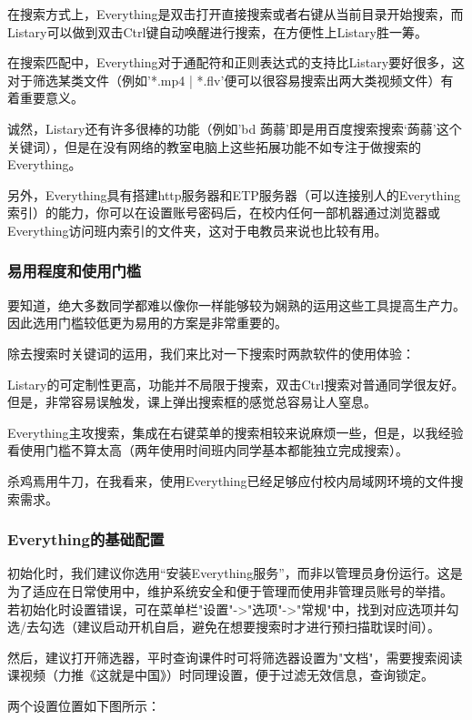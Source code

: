 \documentclass[a5paper]{article}
\begin{document}
            在搜索方式上，Everything是双击打开直接搜索或者右键从当前目录开始搜索，而Listary可以做到双击Ctrl键自动唤醒进行搜索，在方便性上Listary胜一筹。

            在搜索匹配中，Everything对于通配符和正则表达式的支持比Listary要好很多，这对于筛选某类文件（例如'*.mp4 | *.flv'便可以很容易搜索出两大类视频文件）有着重要意义。

            诚然，Listary还有许多很棒的功能（例如'bd 蒟蒻'即是用百度搜索搜索‘蒟蒻’这个关键词），但是在没有网络的教室电脑上这些拓展功能不如专注于做搜索的Everything。
        
            另外，Everything具有搭建http服务器和ETP服务器（可以连接别人的Everything索引）的能力，你可以在设置账号密码后，在校内任何一部机器通过浏览器或Everything访问班内索引的文件夹，这对于电教员来说也比较有用。
        \subsubsection{易用程度和使用门槛}
            要知道，绝大多数同学都难以像你一样能够较为娴熟的运用这些工具提高生产力。因此选用门槛较低更为易用的方案是非常重要的。

            除去搜索时关键词的运用，我们来比对一下搜索时两款软件的使用体验：

            Listary的可定制性更高，功能并不局限于搜索，双击Ctrl搜索对普通同学很友好。但是，非常容易误触发，课上弹出搜索框的感觉总容易让人窒息。

            Everything主攻搜索，集成在右键菜单的搜索相较来说麻烦一些，但是，以我经验看使用门槛不算太高（两年使用时间班内同学基本都能独立完成搜索）。

            杀鸡焉用牛刀，在我看来，使用Everything已经足够应付校内局域网环境的文件搜索需求。
        \subsubsection{Everything的基础配置}
            初始化时，我们建议你选用“安装Everything服务”，而非以管理员身份运行。这是为了适应在日常使用中，维护系统安全和便于管理而使用非管理员账号的举措。
            若初始化时设置错误，可在菜单栏"设置"->"选项"->"常规"中，找到对应选项并勾选/去勾选（建议启动开机自启，避免在想要搜索时才进行预扫描耽误时间）。
            
            然后，建议打开筛选器，平时查询课件时可将筛选器设置为"文档"，需要搜索阅读课视频（力推《这就是中国》）时同理设置，便于过滤无效信息，查询锁定。

            两个设置位置如下图所示：
\end{document}
